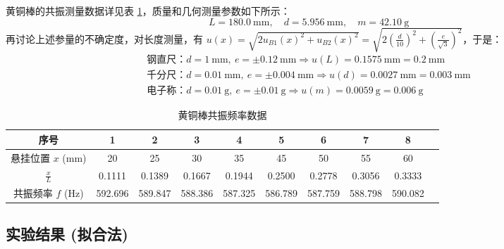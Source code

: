 \documentclass[UTF8]{article}
\theoremstyle{MyLineTheoremStyle} %
\theoremstyle{MyBlockTheoremStyle} %
\theoremstyle{MySubsubsectionStyle} %
\begin{document}
黄铜棒的共振测量数据详见表 \ref{黄铜棒共振频率数据}，质量和几何测量参数如下所示：
\begin{equation}
    L = 180.0 \ \mathrm{mm},\quad 
    d = 5.956 \ \mathrm{mm},\quad 
    m = 42.10 \ \mathrm{g}
\end{equation}
\noindent 再讨论上述参量的不确定度，对长度测量，有 $u(x) = \sqrt{2 u_{B1}(x)^2 + u_{B2}(x)^2 } = \sqrt{ 2 \left(\frac{d}{10}\right)^2 + \left(\frac{e}{\sqrt{3}}\right)^2 }$，于是：
\begin{gather}
\text{钢直尺：} d = 1 \ \mathrm{mm},\ e = \pm 0.12 \ \mathrm{mm} \Longrightarrow u(L) = 0.1575 \ \mathrm{mm} = 0.2 \ \mathrm{mm}\\ 
\text{千分尺：} d = 0.01 \ \mathrm{mm},\ e = \pm 0.004 \ \mathrm{mm} \Longrightarrow u(d) =  0.0027 \ \mathrm{mm} = 0.003 \ \mathrm{mm}\\ 
\text{电子称：} d = 0.01 \ \mathrm{g},\ e = \pm 0.01 \ \mathrm{g} \Longrightarrow u(m) = 0.0059 \ \mathrm{g} = 0.006 \ \mathrm{g}
\end{gather}


\begin{table}[H]\centering
    \caption{黄铜棒共振频率数据}
    \label{黄铜棒共振频率数据}
\begin{tabular}{cccccccccc}\toprule
    序号 & 1 & 2 & 3 & 4 & 5 & 6 & 7 & 8 \\
    \midrule
    悬挂位置 $x$ (mm) & 20 & 25 & 30 & 35 & 45 & 50 & 55 & 60 \\
    $\frac{x}{L}$  & 0.1111 & 0.1389 & 0.1667 & 0.1944 & 0.2500 & 0.2778 & 0.3056 & 0.3333 \\
    共振频率 $f$ (Hz) & 592.696 & 589.847 & 588.386 & 587.325 & 586.789 & 587.759 & 588.798 & 590.082 \\
    \bottomrule
\end{tabular}
\end{table}

\subsection{实验结果 (拟合法)}
\end{document}
